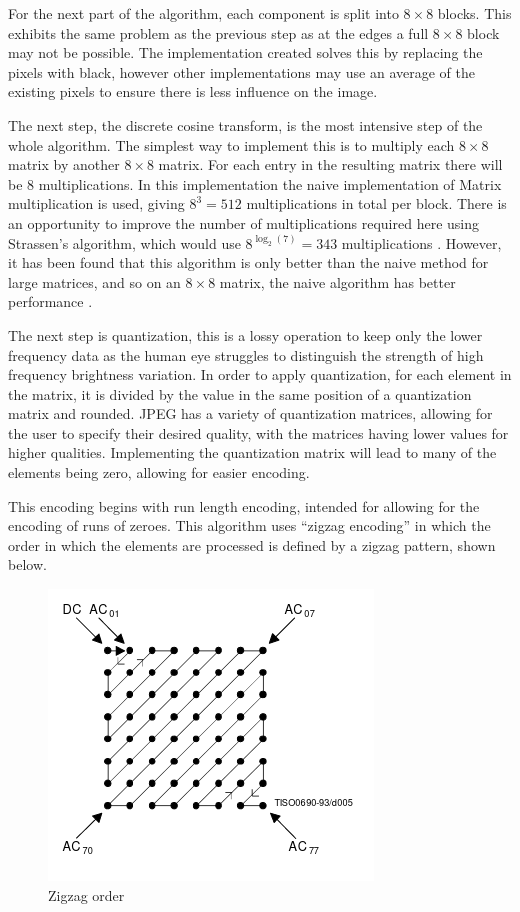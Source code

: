 \documentclass[12pt,a4paper]{article}
\begin{document}
For the next part of the algorithm, each component is split into $8\times 8$ blocks. This exhibits the same problem as the previous step as at the edges a full $8\times 8$ block may not be possible. The implementation created solves this by replacing the pixels with black, however other implementations may use an average of the existing pixels to ensure there is less influence on the image.

The next step, the discrete cosine transform, is the most intensive step of the whole algorithm. The simplest way to implement this is to multiply each $8\times 8$ matrix by another $8\times 8$ matrix. For each entry in the resulting matrix there will be $8$ multiplications. In this implementation the naive implementation of Matrix multiplication is used, giving $8^3 = 512$ multiplications in total per block. There is an opportunity to improve the number of multiplications required here using Strassen's algorithm, which would use $8^{\log_2(7)}=343$ multiplications \cite{strassen1969gaussian}. However, it has been found that this algorithm is only better than the naive method for large matrices, and so on an $8\times 8$ matrix, the naive algorithm has better performance \cite{huang2016strassen}.


The next step is quantization, this is a lossy operation to keep only the lower frequency data as the human eye struggles to distinguish the strength of high frequency brightness variation. In order to apply quantization, for each element in the matrix, it is divided by the value in the same position of a quantization matrix and rounded. JPEG has a variety of quantization matrices, allowing for the user to specify their desired quality, with the matrices having lower values for higher qualities. Implementing the quantization matrix will lead to many of the elements being zero, allowing for easier encoding.

This encoding begins with run length encoding, intended for allowing for the encoding of runs of zeroes. This algorithm uses “zigzag encoding” in which the order in which the elements are processed is defined by a zigzag pattern, shown below.
\begin{figure}[H]
    \centering
    \includegraphics{zigzag.png}
    \caption{Zigzag order \protect\cite{jpeg}}
\end{figure}
\end{document}
